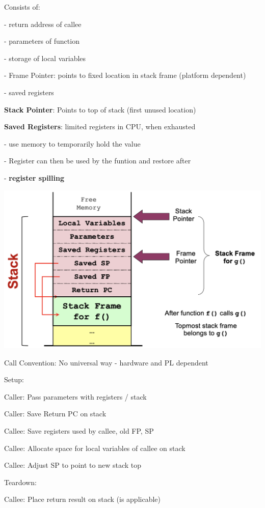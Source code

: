 \documentclass[10pt, a4paper]{article}
\newcommand{\highlight}[1]{{\color{red}\textbf{#1}}}
\newcommand{\red}[1]{{\color{red}#1}}
\newcommand{\green}[1]{{\color{ForestGreen}#1}}
\newcommand{\tab}[0]{\hspace*{2mm}}
\begin{document}
\begin{multicols*}{3}
		Consists of:

		- return address of callee

		- parameters of function

		- storage of local variables

		- Frame Pointer: points to fixed location in stack frame (platform dependent)

		- saved registers

		\textbf{Stack Pointer}: Points to top of stack (first unused location)

		\textbf{Saved Registers}: limited registers in CPU, when exhausted

		\tab{} - use memory to temporarily hold the value

		\tab{} - Register can then be used by the funtion and restore after

		\tab{} - \highlight{register spilling}
		
		\includegraphics[scale=.2]{./assets/stackFrame.png}

		Call Convention: No universal way - hardware and PL dependent

		Setup:

		\red{Caller:} Pass parameters with registers / stack

		\red{Caller:} Save Return PC on stack

		\green{Callee:} Save registers used by callee, old FP, SP

		\green{Callee:} Allocate space for local variables of callee on stack

		\green{Callee:} Adjust SP to point to new stack top

		Teardown:

		\green{Callee:} Place return result on stack (is applicable)


\end{multicols*}
\end{document}
